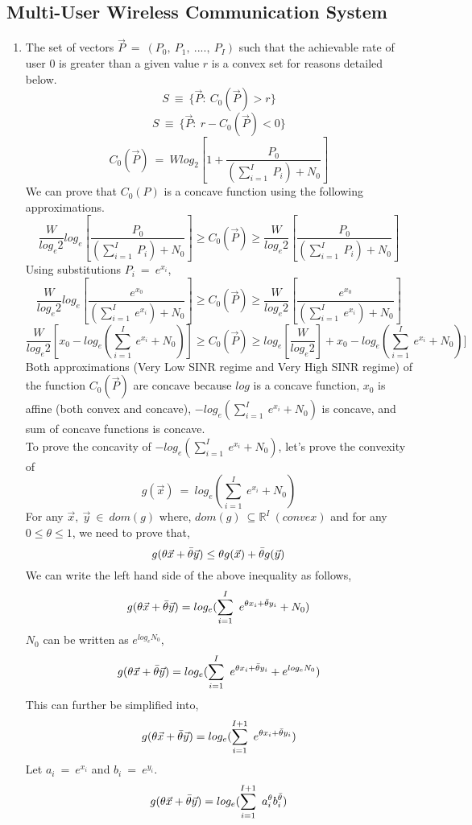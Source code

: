 \documentclass[12pt, draftcls, onecolumn]{IEEEtran}
\begin{document}
\subsection{Multi-User Wireless Communication System}
\begin{enumerate}
    \item The set of vectors $\Vec{P}\ =\ (P_0,\ P_1,\ ....,\ P_I)$ such that the achievable rate of user 0 is greater than a given value $r$ is a convex set for reasons detailed below.
    \[S\ \equiv\ \{\Vec{P}:\ C_0(\Vec{P}) > r\}\]
    \[S\ \equiv\ \{\Vec{P}:\ r-C_0(\Vec{P}) < 0\}\]
    \[C_0(\Vec{P})\ =\ Wlog_2[1+\frac{P_0}{(\sum_{i=1}^I\ P_i) + N_0}]\]
    We can prove that $C_0(P)$ is a concave function using the following approximations.
    \[\frac{W}{log_e2}log_e[\frac{P_0}{(\sum_{i=1}^I\ P_i)+N_0}] \geq C_0(\Vec{P}) \geq \frac{W}{log_e2}[\frac{P_0}{(\sum_{i=1}^I\ P_i)+N_0}]\]
    Using substitutions $P_i\ =\ e^{x_i}$,
    \[\frac{W}{log_e2}log_e[\frac{e^{x_0}}{(\sum_{i=1}^I\ e^{x_i})+N_0}] \geq C_0(\Vec{P}) \geq \frac{W}{log_e2}[\frac{e^{x_0}}{(\sum_{i=1}^I\ e^{x_i})+N_0}]\]
    \[\frac{W}{log_e2}[x_0-log_e(\sum_{i=1}^I\ e^{x_i}+N_0)] \geq C_0(\Vec{P}) \geq log_e[\frac{W}{log_e2}]+x_0-log_e(\sum_{i=1}^I\ e^{x_i}+N_0)]\]
    Both approximations (Very Low SINR regime and Very High SINR regime) of the function $C_0(\Vec{P})$ are concave because $log$ is a concave function, $x_0$ is affine (both convex and concave), $-log_e(\sum_{i=1}^I\ e^{x_i}+N_0)$ is concave, and sum of concave functions is concave.
    \\To prove the concavity of $-log_e(\sum_{i=1}^I\ e^{x_i}+N_0)$, let's prove the convexity of 
    \[g(\Vec{x})\ =\ log_e(\sum_{i=1}^I\ e^{x_i}+N_0)\]
    For any $\Vec{x},\ \Vec{y}\ \in\ dom(g)$ where, $dom(g)\ \subseteq \mathbb{R}^I\ (convex)$ and for any $0 \leq \theta \leq 1$, we need to prove that,
    \[g(\theta \Vec{x} + \Bar{\theta} \Vec{y}) \leq \theta g(\Vec{x}) + \Bar{\theta} g(\Vec{y})\]
    We can write the left hand side of the above inequality as follows,
    \[g(\theta \Vec{x} + \Bar{\theta} \Vec{y}) = log_e(\sum_{i=1}^I\ e^{\theta x_i + \Bar{\theta} y_i}+N_0)\]
    $N_0$ can be written as $e^{log_e N_0}$,
    \[g(\theta \Vec{x} + \Bar{\theta} \Vec{y}) = log_e(\sum_{i=1}^I\ e^{\theta x_i + \Bar{\theta} y_i}+e^{log_e N_0})\]
    This can further be simplified into,
    \[g(\theta \Vec{x} + \Bar{\theta} \Vec{y}) = log_e(\sum_{i=1}^{I+1}\ e^{\theta x_i + \Bar{\theta} y_i})\]
    Let $a_i\ =\ e^{x_i}$ and $b_i\ =\ e^{y_i}$.
    \[g(\theta \Vec{x} + \Bar{\theta} \Vec{y}) = log_e(\sum_{i=1}^{I+1}\ a_i^{\theta}b_i^{\Bar{\theta}})\]

\end{enumerate}
\end{document}

